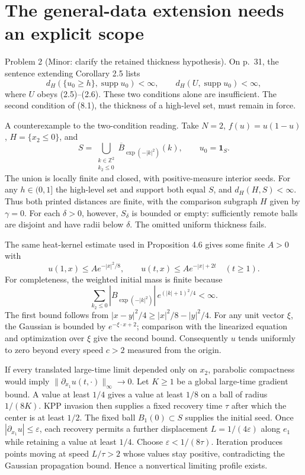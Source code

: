 \documentclass[10pt]{article}
\begin{document}
\section*{The general-data extension needs an explicit scope}
Problem 2 (Minor: clarify the retained thickness hypothesis).  On p. 31, the sentence extending Corollary 2.5 lists \[d_H(\{u_0\ge h\},\operatorname{supp}u_0)<\infty,
 \qquad d_H(U,\operatorname{supp}u_0)<\infty,\] where \(U\) obeys (2.5)–(2.6). These two conditions alone are insufficient. The second condition of (8.1), the thickness of a high-level set, must remain in force.\par
A counterexample to the two-condition reading. Take \(N=2\), \(f(u)=u(1-u)\), \(H=\{x_2\le0\}\), and \[S=\bigcup_{\substack{k\in\mathbb Z^2\\k_2\le0}}
       \overline B_{\exp(-|k|^2)}(k),\qquad u_0=\mathbf1_S.\] The union is locally finite and closed, with positive-measure interior seeds. For any \(h\in(0,1]\) the high-level set and support both equal \(S\), and \(d_H(H,S)<\infty\). Thus both printed distances are finite, with the comparison subgraph \(H\) given by \(\gamma=0\). For each \(\delta>0\), however, \(S_\delta\) is bounded or empty: sufficiently remote balls are disjoint and have radii below \(\delta\). The omitted uniform thickness fails.\par
The same heat-kernel estimate used in Proposition 4.6 gives some finite \(A>0\) with \[u(1,x)\le A e^{-|x|^2/8},\qquad
 u(t,x)\le A e^{-|x|+2t}\quad(t\ge1).\] For completeness, the weighted initial mass is finite because \[\sum_{k_2\le0}
  |B_{\exp(-|k|^2)}|\,e^{(|k|+1)^2/4}<\infty.\] The first bound follows from \(|x-y|^2/4\ge |x|^2/8-|y|^2/4\). For any unit vector \(\xi\), the Gaussian is bounded by \(e^{-\xi\cdot x+2}\); comparison with the linearized equation and optimization over \(\xi\) give the second bound. Consequently \(u\) tends uniformly to zero beyond every speed \(c>2\) measured from the origin.\par
If every translated large-time limit depended only on \(x_2\), parabolic compactness would imply \(\|\partial_{x_1}u(t,\cdot)\|_\infty\to0\). Let \(K\ge1\) be a global large-time gradient bound. A value at least \(1/4\) gives a value at least \(1/8\) on a ball of radius \(1/(8K)\). KPP invasion then supplies a fixed recovery time \(\tau\) after which the center is at least \(1/2\). The fixed ball \(B_1(0)\subset S\) supplies the initial seed. Once \(|\partial_{x_1}u|\le\varepsilon\), each recovery permits a further displacement \(L=1/(4\varepsilon)\) along \(e_1\) while retaining a value at least \(1/4\). Choose \(\varepsilon<1/(8\tau)\). Iteration produces points moving at speed \(L/\tau>2\) whose values stay positive, contradicting the Gaussian propagation bound. Hence a nonvertical limiting profile exists.\par
\end{document}
